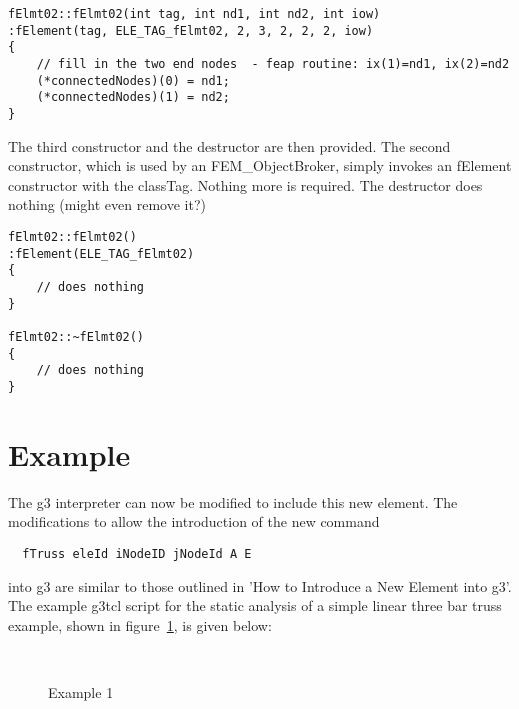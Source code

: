 \documentclass[12pt]{article}
\begin{document}
{\sf\small \begin{verbatim}
fElmt02::fElmt02(int tag, int nd1, int nd2, int iow)
:fElement(tag, ELE_TAG_fElmt02, 2, 3, 2, 2, 2, iow)
{
    // fill in the two end nodes  - feap routine: ix(1)=nd1, ix(2)=nd2
    (*connectedNodes)(0) = nd1; 
    (*connectedNodes)(1) = nd2;   
}
\end{verbatim}}

The third constructor and the destructor are then provided. The
second constructor, which is used by an FEM\_ObjectBroker, simply
invokes an fElement constructor with the classTag. Nothing more is
required. The destructor does nothing (might even remove it?)

{\sf\small \begin{verbatim}
fElmt02::fElmt02()
:fElement(ELE_TAG_fElmt02)    
{
    // does nothing
}

fElmt02::~fElmt02()
{
    // does nothing
}
\end{verbatim}}


\section{Example}
The g3 interpreter can now be modified to include this new
element. The modifications to allow the introduction of the new
command
{\sf \begin{verbatim}
  fTruss eleId iNodeID jNodeId A E
\end{verbatim} } 
\noindent into g3 are similar to those outlined in 'How to Introduce a
New Element into g3'. The example g3tcl script for the static analysis of a
simple linear three bar truss example, shown in figure~\ref{example1},
is given below:   

\pagebreak
\begin{figure}[htpb]
\begin{center}
\leavevmode
\hbox{%
}
\end{center}
\caption{Example 1}
\label{example1}
\end{figure}
\end{document}
